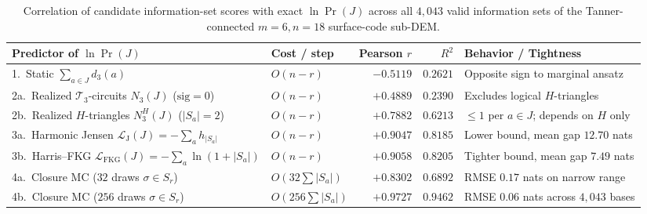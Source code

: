 \documentclass[12pt]{article}
\theoremstyle{definition}
\newcommand{\Tc}{\mathcal{T}_3}
\newcommand{\LH}{\mathcal{L}_{\mathrm{J}}}
\newcommand{\LFKG}{\mathcal{L}_{\mathrm{FKG}}}
\begin{document}
\begin{table}[htbp]
\centering
\caption{Correlation of candidate information-set scores with exact $\ln \Pr(J)$ across all $4{,}043$ valid
information sets of the Tanner-connected $m = 6, n = 18$ surface-code sub-DEM.}\label{tab:infoset_corr}
\smallskip
\scriptsize
\setlength{\tabcolsep}{3.5pt}
\begin{tabular}{@{}llrr>{\raggedright\arraybackslash}p{}@{}}
\toprule
Predictor of $\ln \Pr(J)$ & Cost / step & Pearson $r$ & $R^2$ & Behavior / Tightness \\
\midrule
1.\ Static $\sum_{a \in J} d_3(a)$ & $O(n - r)$ & $\mathbf{-0.5119}$ & $0.2621$ &
  Opposite sign to marginal ansatz \\
2a.\ Realized $\Tc$-circuits $N_3(J)$ ($\mathrm{sig}=0$) & $O(n - r)$ & $+0.4889$ & $0.2390$ &
  Excludes logical $H$-triangles \\
2b.\ Realized $H$-triangles $N_3^H(J)$ ($|S_a|=2$) & $O(n - r)$ & $\mathbf{+0.7882}$ & $0.6213$ &
  $\le 1$ per $a \in J$; depends on $H$ only \\
3a.\ Harmonic Jensen $\LH(J) = -\sum_a h_{|S_a|}$ & $O(n - r)$ & $+0.9047$ & $0.8185$ &
  Lower bound, mean gap $12.70$ nats \\
3b.\ Harris--FKG $\LFKG(J) = -\sum_a \ln(1 + |S_a|)$ & $O(n - r)$ & $\mathbf{+0.9058}$ & $\mathbf{0.8205}$ &
  Tighter bound, mean gap $7.49$ nats \\
4a.\ Closure MC ($32$ draws $\sigma \in S_r$) & $O(32\sum|S_a|)$ & $+0.8302$ & $0.6892$ &
  RMSE $0.17$ nats on narrow range \\
4b.\ Closure MC ($256$ draws $\sigma \in S_r$) & $O(256\sum|S_a|)$ & $\mathbf{+0.9727}$ & $\mathbf{0.9462}$ &
  RMSE $0.06$ nats across $4{,}043$ bases \\
\bottomrule
\end{tabular}
\end{table}
\end{document}
